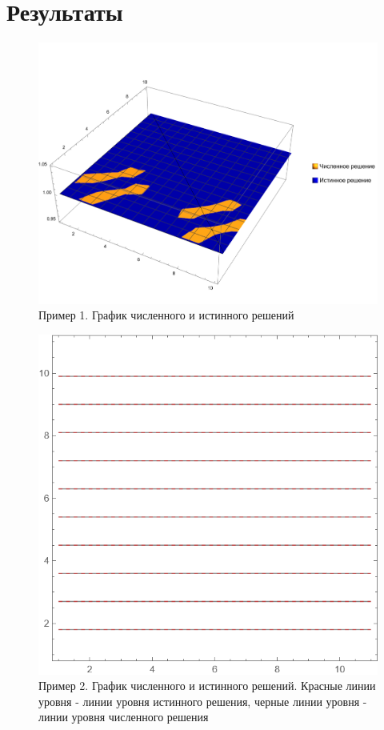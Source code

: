 \documentclass{article}
\begin{document}
	\section{Результаты}
	\begin{figure}[H]
        \centering
        \includegraphics[width=\textwidth]{test1.png}
        \caption{Пример 1. График численного и истинного решений}
    \end{figure}
	\begin{figure}[H]
        \centering
        \includegraphics[width=\textwidth]{test2.png}
        \caption{Пример 2. График численного и истинного решений.
		 Красные линии уровня - линии уровня истинного решения, черные линии уровня - 
		 линии уровня численного решения}
    \end{figure}
\end{document}
